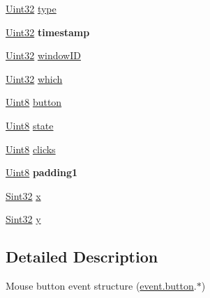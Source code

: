 \begin{DoxyCompactItemize}
\item 
\hyperlink{_s_d_l__stdinc_8h_add440eff171ea5f55cb00c4a9ab8672d}{Uint32} \hyperlink{struct_s_d_l___mouse_button_event_af64cb09ea68b8081ecc8ee498552e3d7}{type}
\item 
\hypertarget{struct_s_d_l___mouse_button_event_ab05e8a454692608ff56c502e95799c56}{}\hyperlink{_s_d_l__stdinc_8h_add440eff171ea5f55cb00c4a9ab8672d}{Uint32} {\bfseries timestamp}\label{struct_s_d_l___mouse_button_event_ab05e8a454692608ff56c502e95799c56}

\item 
\hyperlink{_s_d_l__stdinc_8h_add440eff171ea5f55cb00c4a9ab8672d}{Uint32} \hyperlink{struct_s_d_l___mouse_button_event_ab3b855d4b543b5d02fcf5d56e4421393}{window\+I\+D}
\item 
\hyperlink{_s_d_l__stdinc_8h_add440eff171ea5f55cb00c4a9ab8672d}{Uint32} \hyperlink{struct_s_d_l___mouse_button_event_a366aef59a0f393afc8a3561e741825df}{which}
\item 
\hyperlink{_s_d_l__stdinc_8h_a2944638813a090aa23e62f4da842c3e2}{Uint8} \hyperlink{struct_s_d_l___mouse_button_event_a1a4680e19ae06d02d2093f0bcba1b24c}{button}
\item 
\hyperlink{_s_d_l__stdinc_8h_a2944638813a090aa23e62f4da842c3e2}{Uint8} \hyperlink{struct_s_d_l___mouse_button_event_a8809cef85cfffad4f2059f2ba4fc6a3d}{state}
\item 
\hyperlink{_s_d_l__stdinc_8h_a2944638813a090aa23e62f4da842c3e2}{Uint8} \hyperlink{struct_s_d_l___mouse_button_event_aa606bebcbc3ffc7e932016039c2a36a1}{clicks}
\item 
\hypertarget{struct_s_d_l___mouse_button_event_a765957d218d16fa00558fa4d20e80689}{}\hyperlink{_s_d_l__stdinc_8h_a2944638813a090aa23e62f4da842c3e2}{Uint8} {\bfseries padding1}\label{struct_s_d_l___mouse_button_event_a765957d218d16fa00558fa4d20e80689}

\item 
\hyperlink{_s_d_l__stdinc_8h_a7a90b941db9d4582e9ad7abb9940ff7e}{Sint32} \hyperlink{struct_s_d_l___mouse_button_event_a5bb9c61b86e999f58637511e32e3a076}{x}
\item 
\hyperlink{_s_d_l__stdinc_8h_a7a90b941db9d4582e9ad7abb9940ff7e}{Sint32} \hyperlink{struct_s_d_l___mouse_button_event_a7ccb5c55a7ddadce723f4ea6d5269540}{y}
\end{DoxyCompactItemize}


\subsection{Detailed Description}
Mouse button event structure (\hyperlink{union_s_d_l___event_ab6da2fa2687e5f849f270adecc64785f}{event.\+button}.$\ast$) 

